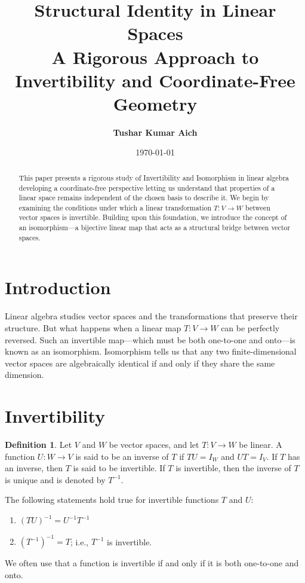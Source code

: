 \documentclass[12pt, a4paper]{article}
\title{\textbf{\Large Structural Identity in Linear Spaces \\ \large A Rigorous Approach to Invertibility and Coordinate-Free Geometry}}
\author{\textbf{Tushar Kumar Aich}}
\date{\today}
\theoremstyle{definition}
\newtheorem{definition}{Definition}[section]
\theoremstyle{remark}
\begin{document}
\maketitle

\begin{abstract}
    This paper presents a rigorous study of Invertibility and Isomorphism in linear algebra developing a coordinate-free perspective letting us understand that properties of a linear space remains independent of the chosen basis to describe it. We begin by examining the conditions under which a linear transformation $T: V \to W$ between vector spaces is invertible. Building upon this foundation, we introduce the concept of an isomorphism—a bijective linear map that acts as a structural bridge between vector spaces.
\end{abstract}

\section{Introduction}
Linear algebra studies vector spaces and the transformations that preserve their structure. But what happens when a linear map $T: V \to W$ can be perfectly reversed. Such an invertible map—which must be both one-to-one and onto—is known as an isomorphism. Isomorphism tells us that any two finite-dimensional vector spaces are algebraically identical if and only if they share the same dimension.

\section{Invertibility}

\begin{definition}
    Let $V$ and $W$ be vector spaces, and let $T: V \to W$ be linear. A function $U: W \to V$ is said to be an inverse of $T$ if $TU = I_W$ and $UT = I_V$. If $T$ has an inverse, then $T$ is said to be invertible. If $T$ is invertible, then the inverse of $T$ is unique and is denoted by $T^{-1}$.
\end{definition}
The following statements hold true for invertible functions $T$ and $U$:
\begin{enumerate}
    \item[(1)] $(TU)^{-1} = U^{-1}T^{-1}$
    \item[(2)] $(T^{-1})^{-1} = T$; i.e., $T^{-1}$ is invertible.
\end{enumerate}

We often use that a function is invertible if and only if it is both one-to-one and onto.
\end{document}
